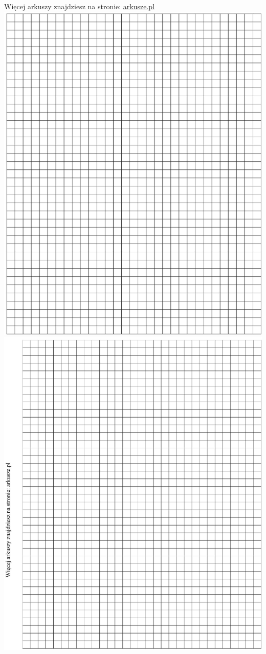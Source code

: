 \documentclass[10pt]{article}
\begin{document}
Więcej arkuszy znajdziesz na stronie: \href{http://arkusze.pl}{arkusze.pl}\\
\includegraphics[max width=\textwidth, center]{2024_11_21_5229b9d0453456f1828dg-20}\\
\includegraphics[max width=\textwidth, center]{2024_11_21_5229b9d0453456f1828dg-21}
\end{document}
